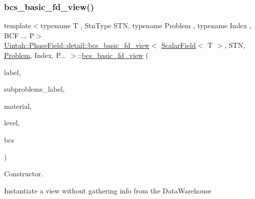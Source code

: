 \subsubsection{\texorpdfstring{bcs\+\_\+basic\+\_\+fd\+\_\+view()}{bcs\_basic\_fd\_view()}\hspace{0.1cm}{\footnotesize\ttfamily [2/4]}}
{\footnotesize\ttfamily template$<$typename T , Stn\+Type S\+TN, typename Problem , typename Index , B\+C\+F ... P$>$ \\
\hyperlink{classUintah_1_1PhaseField_1_1detail_1_1bcs__basic__fd__view}{Uintah\+::\+Phase\+Field\+::detail\+::bcs\+\_\+basic\+\_\+fd\+\_\+view}$<$ \hyperlink{structUintah_1_1PhaseField_1_1ScalarField}{Scalar\+Field}$<$ T $>$, S\+TN, \hyperlink{classUintah_1_1PhaseField_1_1Problem}{Problem}, Index, P... $>$\+::\hyperlink{classUintah_1_1PhaseField_1_1detail_1_1bcs__basic__fd__view}{bcs\+\_\+basic\+\_\+fd\+\_\+view} (\begin{DoxyParamCaption}\item[{const typename \hyperlink{structUintah_1_1PhaseField_1_1ScalarField_a7a77875e030da64c47ce9f6c22a06959}{Field\+::label\+\_\+type} \&}]{label,  }\item[{const Var\+Label $\ast$}]{subproblems\+\_\+label,  }\item[{int}]{material,  }\item[{const Level $\ast$}]{level,  }\item[{const std\+::vector$<$ \hyperlink{structUintah_1_1PhaseField_1_1BCInfo}{B\+C\+Info}$<$ \hyperlink{structUintah_1_1PhaseField_1_1ScalarField}{Field} $>$ $>$ \&}]{bcs }\end{DoxyParamCaption})\hspace{0.3cm}{\ttfamily [inline]}}



Constructor. 

Instantiate a view without gathering info from the Data\+Warehouse


